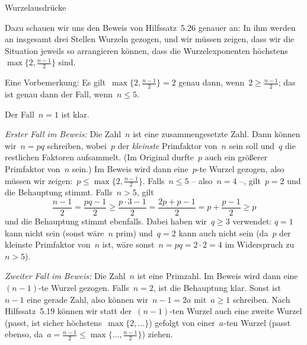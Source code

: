 \documentclass{algblatt}
\begin{document}
\begin{aufgabe}{Wurzelausdrücke}
\begin{loesungE}
\item Dazu schauen wir uns den Beweis von Hilfssatz~5.26 genauer an: In ihm
werden an insgesamt drei Stellen Wurzeln gezogen, und wir müssen zeigen, dass
wir die Situation jeweils so arrangieren können, dass die Wurzelexponenten
höchstens~$\max\{ 2, \frac{n-1}{2} \}$ sind.

Eine Vorbemerkung: Es gilt~$\max\{ 2, \frac{n-1}{2} \} = 2$ genau dann, wenn~$2
\geq \frac{n-1}{2}$; das ist genau dann der Fall, wenn~$n \leq 5$.

Der Fall~$n = 1$ ist klar.

\emph{Erster Fall im Beweis:} Die Zahl~$n$ ist eine zusammengesetzte Zahl. Dann
können wir~$n = p q$ schreiben, wobei~$p$ der \emph{kleinste} Primfaktor von~$n$ sein
soll und~$q$ die restlichen Faktoren aufsammelt. (Im Original durfte~$p$
auch ein größerer Primfaktor von~$n$ sein.) Im Beweis wird dann eine~$p$-te
Wurzel gezogen, also müssen wir zeigen:~$p \leq \max\{ 2, \frac{n-1}{2} \}$.
Falls~$n \leq 5$ -- also~$n = 4$ --, gilt~$p = 2$ und die Behauptung stimmt.
Falls~$n > 5$, gilt
\[ \frac{n-1}{2} = \frac{pq-1}{2} \geq \frac{p\cdot3-1}{2} = \frac{2p + p-1}{2}
= p + \frac{p-1}{2} \geq p \]
und die Behauptung stimmt ebenfalls. Dabei haben wir~$q \geq 3$ verwendet: $q =
1$ kann nicht sein (sonst wäre~$n$ prim) und~$q = 2$ kann auch nicht sein
(da~$p$ der kleinste Primfaktor von~$n$ ist, wäre sonst~$n = p q = 2 \cdot 2 =
4$ im Widerspruch zu~$n > 5$).

\emph{Zweiter Fall im Beweis:} Die Zahl~$n$ ist eine Primzahl. Im Beweis wird
dann eine~$(n-1)$-te Wurzel gezogen. Falls~$n = 2$, ist die Behauptung klar.
Sonst ist~$n-1$ eine gerade Zahl, also können wir~$n-1 = 2a$ mit~$a \geq 1$
schreiben. Nach Hilfssatz~5.19 können wir statt der~$(n-1)$-ten Wurzel auch
eine zweite Wurzel (passt, ist sicher höchstens~$\max\{ 2, \ldots \}$) gefolgt
von einer~$a$-ten Wurzel (passt ebenso, da~$a = \frac{n-1}{2} \leq \max\{
\ldots, \frac{n-1}{2} \}$) ziehen.
\end{loesungE}
\end{aufgabe}
\end{document}
